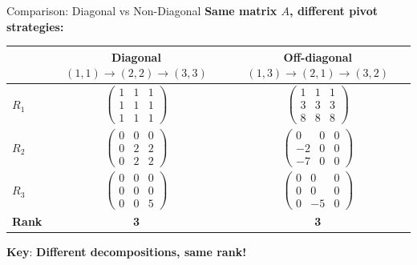 \documentclass[10pt]{beamer}
\theoremstyle{definition}
\newcommand{\x}[1]{\alert{\textbf{#1}}}
\begin{document}
\begin{frame}{Comparison: Diagonal vs Non-Diagonal}
\textbf{Same matrix $A$, different pivot strategies:}

\vspace{0.3cm}
\begin{tabular}{l|c|c}
& \textbf{Diagonal} $(1,1) \to (2,2) \to (3,3)$ & \textbf{Off-diagonal} $(1,3) \to (2,1) \to (3,2)$ \\
\hline
$R_1$ & $\begin{pmatrix}
1 & 1 & 1 \\
1 & 1 & 1 \\
1 & 1 & 1
\end{pmatrix}$ &
$\begin{pmatrix}
1 & 1 & 1 \\
3 & 3 & 3 \\
8 & 8 & 8
\end{pmatrix}$ \\[10pt]
$R_2$ & $\begin{pmatrix}
0 & 0 & 0 \\
0 & 2 & 2 \\
0 & 2 & 2
\end{pmatrix}$ &
$\begin{pmatrix}
0 & 0 & 0 \\
-2 & 0 & 0 \\
-7 & 0 & 0
\end{pmatrix}$ \\[10pt]
$R_3$ & $\begin{pmatrix}
0 & 0 & 0 \\
0 & 0 & 0 \\
0 & 0 & 5
\end{pmatrix}$ &
$\begin{pmatrix}
0 & 0 & 0 \\
0 & 0 & 0 \\
0 & -5 & 0
\end{pmatrix}$ \\
\hline
\textbf{Rank} & \x{3} & \x{3} \\
\end{tabular}

\vfill
\textbf{Key}: \x{Different decompositions, same rank!}
\end{frame}
\end{document}
